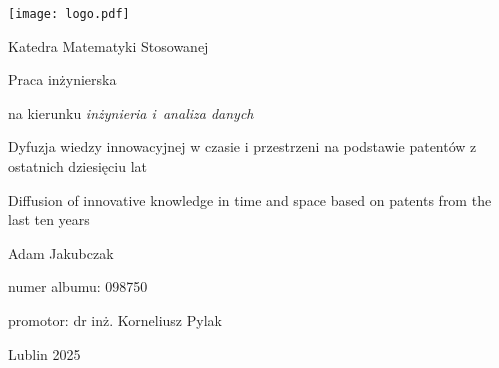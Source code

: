 \thispagestyle{empty}%


\newcommand\tytul{Dyfuzja wiedzy innowacyjnej w czasie i przestrzeni
                  na podstawie patentów z ostatnich dziesięciu lat}

\newcommand\tytulangielski{Diffusion of innovative knowledge 
                           in time and space based on patents 
                           from the last ten years}

\noindent
\hspace*{-3mm}\texttt{[image: logo.pdf]}
\fontsize{12pt}{15pt}\selectfont

\vfil 
\noindent Katedra Matematyki Stosowanej

\vfil\vfil\vfil\vfil


\fontsize{40pt}{50pt}\selectfont
\noindent Praca inżynierska

\fontsize{12pt}{15pt}\selectfont


\vfil
\noindent
na kierunku \emph{inżynieria i~analiza danych}
\vfil\vfil

\vspace{2cm}
\fontsize{16pt}{18pt}\selectfont
\noindent \tytul

\vspace{1cm}
\fontsize{16pt}{18pt}\selectfont
\noindent \tytulangielski

\vfil\vfil\vfil\vfil
\fontsize{16pt}{20pt}\selectfont

\noindent 
Adam Jakubczak

\vfil
\fontsize{12pt}{15pt}\selectfont
\noindent
numer albumu: 098750


\vfil

\noindent
promotor: dr inż. Korneliusz Pylak

\vfil\vfil\vfil

\fontsize{9pt}{12pt}\selectfont

\noindent
Lublin 2025

\normalsize \rm